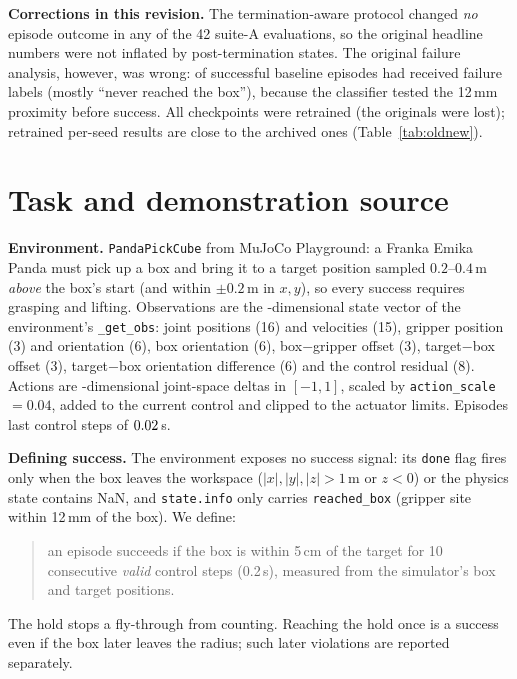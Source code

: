 \documentclass[11pt]{article}
\begin{document}
\textbf{Corrections in this revision.} The termination-aware protocol changed
\emph{no} episode outcome in any of the 42 suite-A evaluations, so the original
headline numbers were not inflated by post-termination states. The original
failure analysis, however, was wrong: \histMislabelled{} of \histSucc{}
successful baseline episodes had received failure labels (mostly ``never reached
the box''), because the classifier tested the 12\,mm proximity before success.
All checkpoints were retrained (the originals were lost); retrained per-seed
results are close to the archived ones (Table~\ref{tab:oldnew}).



\section{Task and demonstration source}
\textbf{Environment.} \texttt{PandaPickCube} from MuJoCo Playground: a Franka
Emika Panda must pick up a box and bring it to a target position sampled
$0.2$--$0.4$\,m \emph{above} the box's start (and within $\pm0.2$\,m in $x,y$),
so every success requires grasping and lifting. Observations are the
\obsDim-dimensional state vector of the environment's \texttt{\_get\_obs}: joint
positions (16) and velocities (15), gripper position (3) and orientation (6),
box orientation (6), box$-$gripper offset (3), target$-$box offset (3),
target$-$box orientation difference (6) and the control residual (8). Actions are
\actDim-dimensional joint-space deltas in $[-1,1]$, scaled by
\texttt{action\_scale}$=0.04$, added to the current control and clipped to the
actuator limits. Episodes last \epLen{} control steps of $0.02$\,s.

\textbf{Defining success.} The environment exposes no success signal: its
\texttt{done} flag fires only when the box leaves the workspace ($|x|,|y|,|z|>1$\,m
or $z<0$) or the physics state contains NaN, and \texttt{state.info} only carries
\texttt{reached\_box} (gripper site within 12\,mm of the box). We define:
\begin{quote}
an episode succeeds if the box is within 5\,cm of the target for 10 consecutive
\emph{valid} control steps (0.2\,s), measured from the simulator's box and target
positions.
\end{quote}
The hold stops a fly-through from counting. Reaching the hold once is a success
even if the box later leaves the radius; such later violations are reported
separately.
\end{document}
